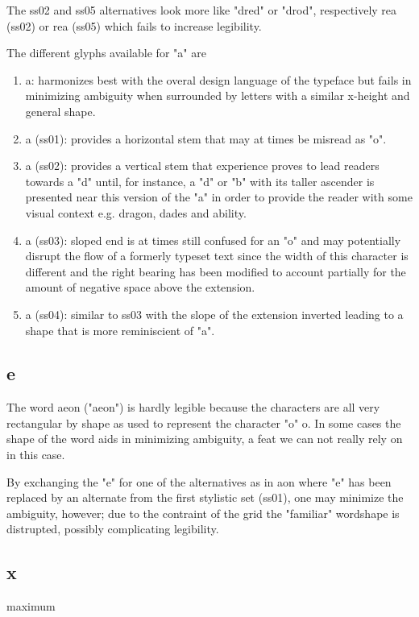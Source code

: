 \documentclass[a4paper]{article}
\begin{document}
The ss02 and ss05 alternatives look more like "dred" or "drod", respectively
{re{\sstwo a}} (ss02) or
{re{\ssfive a}} (ss05)
which fails to increase legibility.

The different glyphs available for "a" are

\begin{enumerate}
  \item {\ssdefault a}: harmonizes best with the overal design language of the
    typeface but fails in minimizing ambiguity when surrounded by letters with
    a similar x-height and general shape.
  \item {\ssone a} (ss01): provides a horizontal stem that may at times be
    misread as "o".
  \item {\sstwo a} (ss02): provides a vertical stem that experience proves to
    lead readers towards a "d" until, for instance, a "d" or "b" with its
    taller ascender is presented near this version of the "a" in order to
    provide the reader with some visual context e.g. {\sstwo dragon},
    {\sstwo dades} and {\sstwo ability}.
  \item {\ssthree a} (ss03): sloped end is at times still confused for an "o"
    and may potentially disrupt the flow of a formerly typeset text since the width
    of this character is different and the right bearing has been modified to
    account partially for the amount of negative space above the extension.
  \item {\ssfour a} (ss04): similar to ss03 with the slope of the extension
    inverted leading to a shape that is more reminiscient of "a".
\end{enumerate}

\subsection{e}
The word {\ssdefault aeon} ("aeon") is hardly legible because the characters
are all very rectangular by shape as used to represent the character "o"
{\ssdefault o}. In some cases the shape of the word aids in minimizing
ambiguity, a feat we can not really rely on in this case.

By exchanging the "e" for one of the alternatives as in
{\ssdefault aon} where "e" has been replaced by an alternate from the
first stylistic set (ss01), one may minimize the ambiguity, however; due to the
contraint of the grid the "familiar" wordshape is distrupted, possibly
complicating legibility.

\subsection{x}
{\ssdefault maximum}
\end{document}
